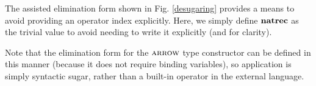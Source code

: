 \documentclass[10pt,preprint]{sigplanconf}
\begin{document}
{\begin{enumerate}
The assisted elimination form shown in Fig. \ref{desugaring} provides a means to avoid providing an operator index explicitly. Here, we simply define ${\textbf{natrec}}$ as the trivial value to avoid needing to write it explicitly (and for clarity).

Note that the elimination form for the $\textsc{arrow}$ type constructor can be defined in this manner (because it does not require binding variables), so application is simply syntactic sugar, rather than a built-in operator in the external language.
\end{enumerate}

%
%
}
\end{document}
